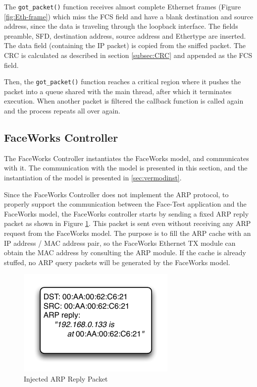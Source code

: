 \documentclass[defaultstyle,10pt,master,Helvetica]{thesis}
\begin{document}
The \texttt{got\_packet()} function receives almost complete Ethernet frames (Figure \ref{fig:Eth-frame}) which miss the \ac{FCS} field and have a blank destination and source address, since the data is traveling through the loopback interface. The fields preamble, \ac{SFD}, destination address, source address and Ethertype are inserted. The data field (containing the \ac{IP} packet) is copied from the sniffed packet. The \ac{CRC} is calculated as described in section \ref{subsec:CRC} and appended as the FCS field.

Then, the \texttt{got\_packet()} function reaches a critical region where it pushes the packet into a queue shared with the main thread, after which it terminates execution. When another packet is filtered the callback function is called again and the process repeats all over again.


\subsection{FaceWorks Controller}

The FaceWorks Controller instantiates the FaceWorks model, and communicates with it. The communication with the model is presented in this section, and the instantiation of the model is presented in \ref{sec:vermodinst}.

Since the FaceWorks Controller does not implement the \ac{ARP} protocol, to properly support the communication between the Face-Test application and the FaceWorks model, the FaceWorks controller starts by sending a fixed \ac{ARP} reply packet as shown in Figure \ref{fig:Arp-packet}. This packet is sent even without receiving any \ac{ARP} request from the FaceWorks model. The purpose is to fill the \ac{ARP} cache with an IP address / \ac{MAC} address pair, so the FaceWorks Ethernet TX module can obtain the MAC address  by consulting the \ac{ARP} module. If the cache is already stuffed, no \ac{ARP} query packets will be generated by the FaceWorks model.

\begin{figure}[h]
  \centering
      \includegraphics[scale=1,center]{Diagrams/ARP-stuffing.pdf}
  \caption{Injected \ac{ARP} Reply Packet }\label{fig:Arp-packet}
\end{figure}
\end{document}
